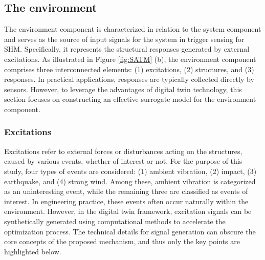 \documentclass[a4paper,fleqn,numbers,sort&compress]{cas-sc}
\begin{document}
\subsection{The environment}
\label{component-environment}

The environment component is characterized in relation to the system component and serves as the source of input signals for the system in trigger sensing for SHM. Specifically, it represents the structural responses generated by external excitations. As illustrated in Figure \ref{fig:SATM} (b), the environment component comprises three interconnected elements: (1) excitations, (2) structures, and (3) responses. In practical applications, responses are typically collected directly by sensors. However, to leverage the advantages of digital twin technology, this section focuses on constructing an effective surrogate model for the environment component. 

\subsubsection{Excitations}
\label{environment-excitations}

Excitations refer to external forces or disturbances acting on the structures, caused by various events, whether of interest or not. For the purpose of this study, four types of events are considered: (1) ambient vibration, (2) impact, (3) earthquake, and (4) strong wind. Among these, ambient vibration is categorized as an uninteresting event, while the remaining three are classified as events of interest. In engineering practice, these events often occur naturally within the environment. However, in the digital twin framework, excitation signals can be synthetically generated using computational methods to accelerate the optimization process. The technical details for signal generation can obscure the core concepts of the proposed mechanism, and thus only the key points are highlighted below. 
\end{document}
